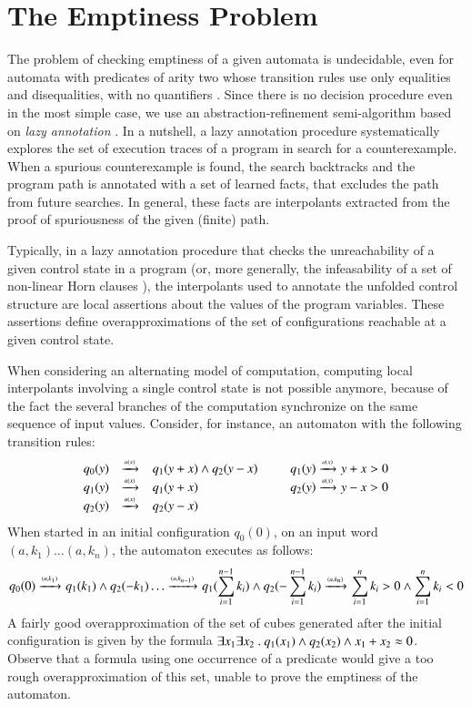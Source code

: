 \documentclass{llncs}
\begin{document}
\section{The Emptiness Problem}

The problem of checking emptiness of a given automata is undecidable,
even for automata with predicates of arity two whose transition rules
use only equalities and disequalities, with no quantifiers
\cite{Farzan15}. Since there is no decision procedure even in the most
simple case, we use an abstraction-refinement semi-algorithm based on
\emph{lazy annotation} \cite{McMillan06,McMillan14}. In a nutshell, a
lazy annotation procedure systematically explores the set of execution
traces of a program in search for a counterexample. When a spurious
counterexample is found, the search backtracks and the program path is
annotated with a set of learned facts, that excludes the path from
future searches. In general, these facts are interpolants extracted
from the proof of spuriousness of the given (finite) path.

Typically, in a lazy annotation procedure that checks the
unreachability of a given control state in a program (or, more
generally, the infeasability of a set of non-linear Horn clauses
\cite{BjornerGurfinkelMcMillanRybalchenko15}), the interpolants used
to annotate the unfolded control structure are local assertions about
the values of the program variables. These assertions define
overapproximations of the set of configurations reachable at a given
control state.

When considering an alternating model of computation, computing local
interpolants involving a single control state is not possible anymore,
because of the fact the several branches of the computation
synchronize on the same sequence of input values. Consider, for
instance, an automaton with the following transition rules:
\[\begin{array}{rclcrcl}
q_0(y) & \xrightarrow{{\scriptscriptstyle a(x)}}_{{\scriptstyle }} & q_1(y+x) \wedge q_2(y-x) & \hspace*{2mm} & 
q_1(y) \xrightarrow{{\scriptscriptstyle a(x)}}_{{\scriptstyle }} y+x > 0 \\
q_1(y) & \xrightarrow{{\scriptscriptstyle a(x)}}_{{\scriptstyle }} & q_1(y+x) && q_2(y) \xrightarrow{{\scriptscriptstyle a(x)}}_{{\scriptstyle }} y-x > 0 \\
q_2(y) & \xrightarrow{{\scriptscriptstyle a(x)}}_{{\scriptstyle }} & q_2(y-x)
\end{array}\]
When started in an initial configuration $q_0(0)$, on an input word
$(a,k_1) \ldots (a,k_n)$, the automaton executes as follows: 
\[q_0(0) \xrightarrow{{\scriptscriptstyle (a,k_1)}}_{{\scriptstyle }} q_1(k_1)
\wedge q_2(-k_1) \ldots \xrightarrow{{\scriptscriptstyle (a,k_{n-1})}}_{{\scriptstyle }} q_1(\sum_{i=1}^{n-1}
k_i) \wedge q_2(-\sum_{i=1}^{n-1} k_i) \xrightarrow{{\scriptscriptstyle (a,k_n)}}_{{\scriptstyle }}
\sum_{i=1}^{n} k_i > 0 \wedge \sum_{i=1}^{n} k_i < 0\] A fairly good
overapproximation of the set of cubes generated after the initial
configuration is given by the formula $\exists x_1 \exists x_2 ~.~
q_1(x_1) \wedge q_2(x_2) \wedge x_1+x_2 \approx 0$. Observe that a
formula using one occurrence of a predicate would give a too rough
overapproximation of this set, unable to prove the emptiness of the
automaton. 
\end{document}
